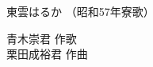 \documentclass[10pt,b5j]{tarticle} %
\begin{document}
\begin{minipage}[c]{0.7\hsize} %
    \begin{center}
        {\LARGE
            東雲はるか %
        }
        {\small 
            （昭和57年寮歌） %
        }
    \end{center}
\end{minipage}
\begin{minipage}[c]{0.3\hsize} %
    \begin{flushright} %
        青木崇君 作歌\\栗田成裕君 作曲 %
    \end{flushright}
\end{minipage}
\end{document}
